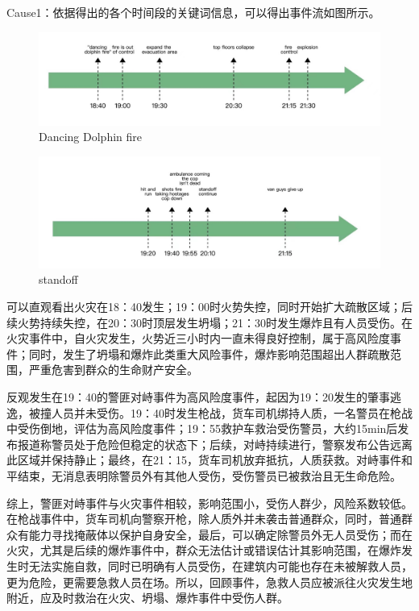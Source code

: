 \documentclass[a4paper]{article}
\begin{document}
Cause1：依据得出的各个时间段的关键词信息，可以得出事件流如图所示。

\begin{figure}[H]
  \centering
  \includegraphics[width=1\textwidth]{images/3-3}
  \caption{Dancing Dolphin fire}\label{fig:3-3}
  \vspace{\baselineskip}
\end{figure}

\begin{figure}[H]
  \centering
  \includegraphics[width=1\textwidth]{images/3-4}
  \caption{standoff}\label{fig:3-4}
  \vspace{\baselineskip}
\end{figure}

可以直观看出火灾在18：40发生；19：00时火势失控，同时开始扩大疏散区域；后续火势持续失控，在20：30时顶层发生坍塌；21：30时发生爆炸且有人员受伤。在火灾事件中，自火灾发生，火势近三小时内一直未得良好控制，属于高风险度事件；同时，发生了坍塌和爆炸此类重大风险事件，爆炸影响范围超出人群疏散范围，严重危害到群众的生命财产安全。

反观发生在19：40的警匪对峙事件为高风险度事件，起因为19：20发生的肇事逃逸，被撞人员并未受伤。19：40时发生枪战，货车司机绑持人质，一名警员在枪战中受伤倒地，评估为高风险度事件；19：55救护车救治受伤警员，大约15min后发布报道称警员处于危险但稳定的状态下；后续，对峙持续进行，警察发布公告远离此区域并保持静止；最终，在21：15，货车司机放弃抵抗，人质获救。对峙事件和平结束，无消息表明除警员外有其他人受伤，受伤警员已被救治且无生命危险。

综上，警匪对峙事件与火灾事件相较，影响范围小，受伤人群少，风险系数较低。在枪战事件中，货车司机向警察开枪，除人质外并未袭击普通群众，同时，普通群众有能力寻找掩蔽体以保护自身安全，最后，可以确定除警员外无人员受伤；而在火灾，尤其是后续的爆炸事件中，群众无法估计或错误估计其影响范围，在爆炸发生时无法实施自救，同时已明确有人员受伤，在建筑内可能也存在未被解救人员，更为危险，更需要急救人员在场。所以，回顾事件，急救人员应被派往火灾发生地附近，应及时救治在火灾、坍塌、爆炸事件中受伤人群。
\end{document}
